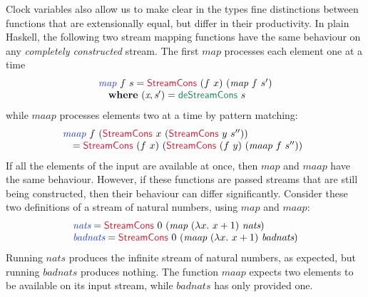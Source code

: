 \documentclass[natbib]{sigplanconf}
\newcommand{\cons}[1]{\textcolor{cons}{\textsf{#1}}}
\newcommand{\elim}[1]{\textcolor{elim}{\textsf{#1}}}
\newcommand{\kw}[1]{\textbf{#1}}
\newcommand{\ident}[1]{\textit{#1}}
\newcommand{\defn}[1]{\textcolor{defnd}{\ident{#1}}}
\begin{document}
Clock variables also allow us to make clear in the types fine
distinctions between functions that are extensionally equal, but
differ in their productivity. In plain Haskell, the following two
stream mapping functions have the same behaviour on any
\emph{completely constructed} stream. The first $\ident{map}$
processes each element one at a time
\begin{displaymath}
  \begin{array}{l}
    \defn{map}~f~s = \cons{StreamCons}~(f~x)~(\ident{map}~f~s') \\
    \quad \kw{where}~(\ident{x}, \ident{s$'$}) = \elim{deStreamCons}~s
  \end{array}
\end{displaymath}
while $\ident{maap}$ processes elements two at a time by pattern matching:
\begin{displaymath}
  \begin{array}{@{}l}
    \defn{maap}~f~(\cons{StreamCons}~x~(\cons{StreamCons}~y~s'')) \\
    \quad = \cons{StreamCons}~(f~x)~(\cons{StreamCons}~(f~y)~(\ident{maap}~f~s''))
  \end{array}
\end{displaymath}
If all the elements of the input are available at once, then
$\ident{map}$ and $\ident{maap}$ have the same behaviour. However, if
these functions are passed streams that are still being constructed,
then their behaviour can differ significantly. Consider these two
definitions of a stream of natural numbers, using $\ident{map}$ and $\ident{maap}$:
\begin{displaymath}
  \begin{array}{l}
    \defn{nats} = \cons{StreamCons}~0~(\ident{map}~(\lambda x.~x+1)~\ident{nats})\\
    \defn{badnats} = \cons{StreamCons}~0~(\ident{maap}~(\lambda x.~x+1)~\ident{badnats})
  \end{array}
\end{displaymath}
Running $\ident{nats}$ produces the infinite stream of natural
numbers, as expected, but running $\ident{badnats}$ produces
nothing. The function $\ident{maap}$ expects two elements to be
available on its input stream, while $\ident{badnats}$ has only
provided one.
\end{document}
